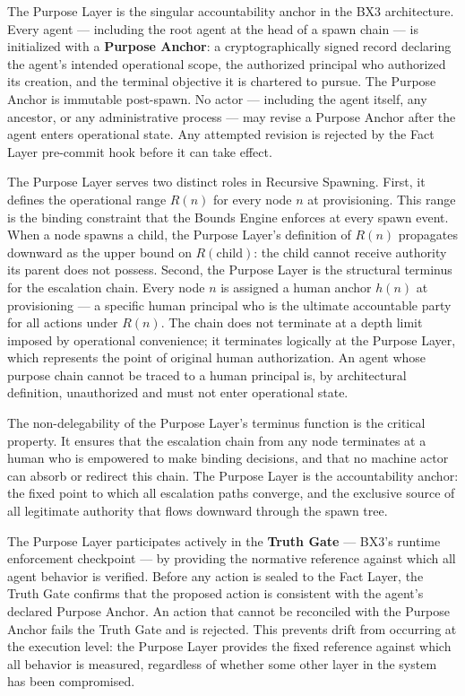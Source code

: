 The Purpose Layer is the singular accountability anchor in the BX3 architecture. Every agent — including the root agent at the head of a spawn chain — is initialized with a \textbf{Purpose Anchor}: a cryptographically signed record declaring the agent's intended operational scope, the authorized principal who authorized its creation, and the terminal objective it is chartered to pursue. The Purpose Anchor is immutable post-spawn. No actor — including the agent itself, any ancestor, or any administrative process — may revise a Purpose Anchor after the agent enters operational state. Any attempted revision is rejected by the Fact Layer pre-commit hook before it can take effect.

The Purpose Layer serves two distinct roles in Recursive Spawning. First, it defines the operational range $R(n)$ for every node $n$ at provisioning. This range is the binding constraint that the Bounds Engine enforces at every spawn event. When a node spawns a child, the Purpose Layer's definition of $R(n)$ propagates downward as the upper bound on $R(\text{child})$: the child cannot receive authority its parent does not possess. Second, the Purpose Layer is the structural terminus for the escalation chain. Every node $n$ is assigned a human anchor $h(n)$ at provisioning — a specific human principal who is the ultimate accountable party for all actions under $R(n)$. The chain does not terminate at a depth limit imposed by operational convenience; it terminates logically at the Purpose Layer, which represents the point of original human authorization. An agent whose purpose chain cannot be traced to a human principal is, by architectural definition, unauthorized and must not enter operational state.

The non-delegability of the Purpose Layer's terminus function is the critical property. It ensures that the escalation chain from any node terminates at a human who is empowered to make binding decisions, and that no machine actor can absorb or redirect this chain. The Purpose Layer is the accountability anchor: the fixed point to which all escalation paths converge, and the exclusive source of all legitimate authority that flows downward through the spawn tree.

The Purpose Layer participates actively in the \textbf{Truth Gate} — BX3's runtime enforcement checkpoint — by providing the normative reference against which all agent behavior is verified. Before any action is sealed to the Fact Layer, the Truth Gate confirms that the proposed action is consistent with the agent's declared Purpose Anchor. An action that cannot be reconciled with the Purpose Anchor fails the Truth Gate and is rejected. This prevents drift from occurring at the execution level: the Purpose Layer provides the fixed reference against which all behavior is measured, regardless of whether some other layer in the system has been compromised.

